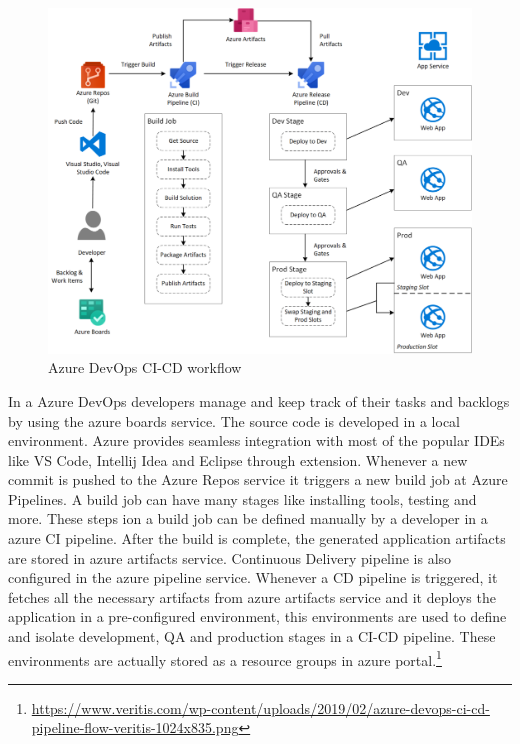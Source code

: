 \documentclass{article}
\begin{document}
\begin{figure}[htp]
    \centering
    \includegraphics[width=13cm]{azure-devops-ci-cd-pipeline-workflow}
    \caption{Azure DevOps CI-CD workflow}
    \label{fig:azure-devops-ci-cd-pipeline-workflow}
\end{figure}

\par

In a Azure DevOps developers manage and keep track of their tasks and backlogs by using the azure boards service. The source code is developed in a local environment. Azure provides seamless integration with most of the popular IDEs like VS Code, Intellij Idea and Eclipse through extension. Whenever a new commit is pushed to the Azure Repos service it triggers a new build job at Azure Pipelines. A build job can have many stages like installing tools, testing and more. These steps ion a build job can be defined manually by a developer in a azure CI pipeline. After the build is complete, the generated application artifacts are stored in azure artifacts service. Continuous Delivery pipeline is also configured in the azure pipeline service. Whenever a CD pipeline is triggered, it fetches all the necessary artifacts from azure artifacts service and it deploys the application in a pre-configured environment, this environments are used to define and isolate development, QA and production stages in a CI-CD pipeline. These environments are actually stored as a resource groups in azure portal.\footnote{\url{https://www.veritis.com/wp-content/uploads/2019/02/azure-devops-ci-cd-pipeline-flow-veritis-1024x835.png}}
\end{document}
